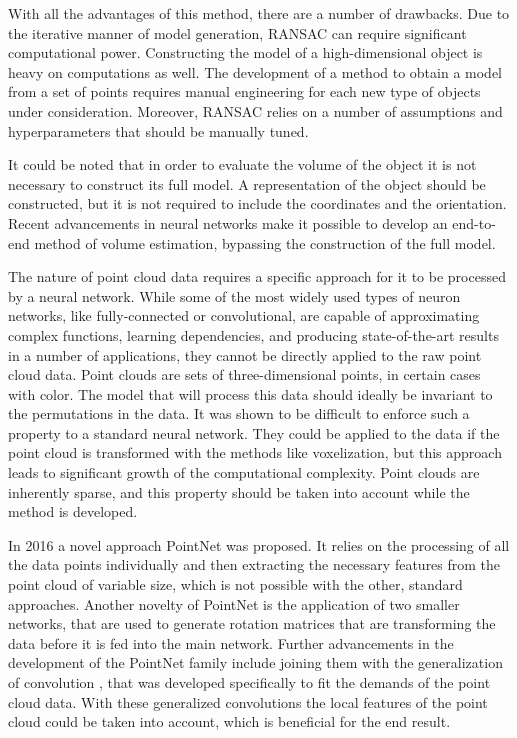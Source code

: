 \begin{thebibliography}{12}
With all the advantages of this method, there are a number of drawbacks.
Due to the iterative manner of model generation, RANSAC can require significant computational power.
Constructing the model of a high-dimensional object is heavy on computations as well.
The development of a method to obtain a model from a set of points requires manual engineering for each new type of objects under consideration.
Moreover, RANSAC relies on a number of assumptions and hyperparameters that should be manually tuned.

It could be noted that in order to evaluate the volume of the object it is not necessary to construct its full model.
A representation of the object should be constructed, but it is not required to include the coordinates and the orientation.
Recent advancements in neural networks make it possible to develop an end-to-end method of volume estimation, bypassing the construction of the full model.

The nature of point cloud data requires a specific approach for it to be processed by a neural network.
While some of the most widely used types of neuron networks, like fully-connected or convolutional, are capable of approximating complex functions, learning dependencies, and producing state-of-the-art results in a number of applications, they cannot be directly applied to the raw point cloud data.
Point clouds are sets of three-dimensional points, in certain cases with color.
The model that will process this data should ideally be invariant to the permutations in the data.
It was shown to be difficult to enforce such a property to a standard neural network.
They could be applied to the data if the point cloud is transformed with the methods like voxelization, but this approach leads to significant growth of the computational complexity.
Point clouds are inherently sparse, and this property should be taken into account while the method is developed.

In 2016 a novel approach PointNet \cite{qi2017pointnet} was proposed.
It relies on the processing of all the data points individually and then extracting the necessary features from the point cloud of variable size, which is not possible with the other, standard approaches.
Another novelty of PointNet is the application of two smaller networks, that are used to generate rotation matrices that are transforming the data before it is fed into the main network.
Further advancements in the development of the PointNet family include joining them with the generalization of convolution \cite{thomas2019kpconv}, that was developed specifically to fit the demands of the point cloud data.
With these generalized convolutions the local features of the point cloud could be taken into account, which is beneficial for the end result.


\end{thebibliography}
